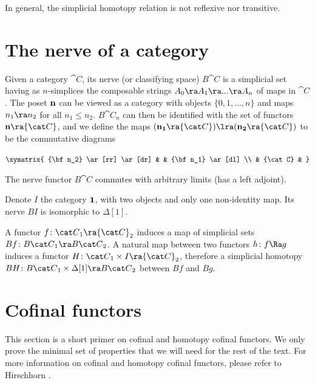 
In general, the simplicial homotopy relation is not reflexive nor transitive.


\section{The nerve of a category}
\label{sec:catnerve}
Given a category ${\cat C}$, its nerve (or classifying space) $B{\cat C}$ is a simplicial set having as $n$-simplices the composable strings $A_0 \ra A_1 \ra ... \ra A_n$ of maps in ${\cat C}$. The poset ${\bf n}$ can be viewed as a category with objects $\{0, 1, ..., n\}$ and maps $n_1 \ra n_2$ for all $n_1 \le n_2$. $B{\cat C}_n$ can then be identified with the set of functors ${\bf n} \ra {\cat C}$, and we define the maps $({\bf n_1} \ra {\cat C}) \lra ({\bf n_2} \ra {\cat C})$ to be the commutative diagrams
\begin{center}
$ \xymatrix {
        {\bf n_2} \ar[rr] \ar[dr] & & {\bf n_1} \ar[dl] \\
	& {\cat C} &
	}$
\end{center}
The nerve functor $B{\cat C}$ commutes with arbitrary limits (has a left adjoint).

Denote $I$ the category ${\bf 1}$, with two objects and only one non-identity map. Its nerve $BI$ is isomorphic to $\Delta[1]$.

A functor $f \colon {\cat C}_1 \ra {\cat C}_2$ induces a map of simplicial sets $Bf \colon B{\cat C}_1 \ra B{\cat C}_2$. A natural map between two functors $h \colon f \Ra g$ induces a functor $H \colon {\cat C}_1 \times I \ra {\cat C}_2$, therefore a simplicial homotopy $BH \colon B{\cat C}_1 \times \Delta[1] \ra B{\cat C}_2$ between $Bf$ and $Bg$.

\bigskip

\section{Cofinal functors}
\label{sec:coffunctors1}
This section is a short primer on cofinal and homotopy cofinal functors. We only prove the minimal set of properties that we will need for the rest of the text. For more information on cofinal and homotopy cofinal functors, please refer to Hirschhorn \cite{Hirschhorn}.

